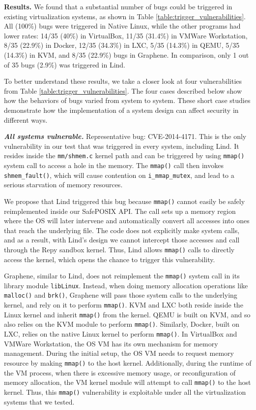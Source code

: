 {{\noindent
\textbf{Results.}
We found that a substantial number of bugs could be triggered in existing
virtualization systems, as shown in Table \ref{table:trigger_vulnerabilities}.
All (100\%) bugs were triggered in Native Linux,
while the other programs had lower rates: 14/35 (40\%) in
VirtualBox,
11/35 (31.4\%)  in VMWare Workstation, 8/35 (22.9\%)  in Docker,
12/35 (34.3\%)  in LXC, 5/35 (14.3\%)  in QEMU, 5/35 (14.3\%)  in KVM,
and 8/35 (22.9\%) bugs in Graphene.
In comparison, only 1 out of 35 bugs  (2.9\%) was triggered in Lind.

To better understand these results, we take a closer look at four
vulnerabilities from Table \ref{table:trigger_vulnerabilities}.
The four cases described below show how the behaviors of bugs varied
from system to system. These short case
studies demonstrate how the implementation of a system design can
affect security in different ways. 

\emph{\textbf{All systems vulnerable.}}  Representative bug: CVE-2014-4171.
This is the only vulnerability in our test that was triggered in every
system, including Lind. It resides inside the \texttt{mm/shmem.c} kernel path and
can be triggered by using \texttt{mmap()} system call to access a hole in the memory.
The \texttt{mmap()} call then invokes \texttt{shmem\_fault()}, which will cause contention
on \texttt{i\_mmap\_mutex}, and lead to a serious starvation of memory resources.

We propose that Lind triggered this bug because \texttt{mmap()} cannot easily
be safely reimplemented inside our SafePOSIX API. The call sets up a
memory region where the OS will later
intervene and automatically convert all accesses into ones that reach the
underlying file.  The code does not explicitly make system calls, and as
a result, with Lind's design we cannot intercept those accesses and call through
the Repy sandbox kernel. Thus,
Lind allows \texttt{mmap()} calls to directly access the kernel, which
opens the chance to trigger this vulnerability.

Graphene, similar to Lind, does not reimplement the
\texttt{mmap()} system call in its library module \texttt{libLinux}. Instead, when doing
memory allocation operations like \texttt{malloc()} and \texttt{brk()}, Graphene will
pass those system calls to the underlying kernel, and rely on it to
perform \texttt{mmap()}.
KVM and LXC both reside inside the Linux kernel and inherit \texttt{mmap()} 
from the kernel. QEMU is built on KVM, and so also relies on the KVM module to perform 
\texttt{mmap()}. Similarly, Docker, built on LXC, relies on the native Linux kernel to perform 
\texttt{mmap()}. In VirtualBox and VMWare Workstation, the OS VM has its own mechanism 
for memory management. During the initial setup, the OS VM needs to request memory resource
by making \texttt{mmap()} to the host kernel. Additionally, during the runtime of the VM process,
when there is excessive memory usage, or reconfiguration of memory allocation, the VM kernel module
will attempt to call \texttt{mmap()} to the host kernel. Thus, this \texttt{mmap()} vulnerability
is exploitable under all the virtualization systems that we tested.

}}
